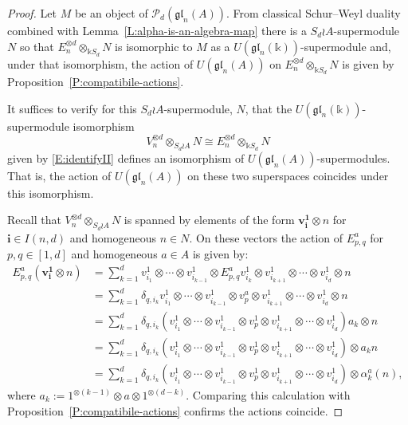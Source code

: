 \documentclass[11pt,reqno]{amsart} %
\newcommand{\gl}{\mathfrak{gl}}
\renewcommand{\k}{\mathds{k}}
\newcommand{\0}{\bar{0}}
\newcommand{\1}{\bar{1}}
\newcommand{\wreath}{\wr}
\newcommand{\bv}{\mathbf{v}}
\newcommand{\SdwreathA}{S_{d} \wreath A}
\newcommand{\bi}{\mathbf{i}}
\newcommand{\bone}{\mathbf{1}}
\newcommand{\Pol}{\mathcal{P}}
\numberwithin{equation}{subsection}
\begin{document}
\begin{proof} Let $M$ be an object of $\Pol_{d}(\gl_{n}(A))$.  From classical Schur--Weyl duality combined with Lemma~\ref{L:alpha-is-an-algebra-map} there is a $\SdwreathA$-supermodule $N$ so that $E_{n}^{\otimes d} \otimes_{\k S_{d}} N$ is isomorphic to $M$ as a $U(\gl_{n}(\k ))$-supermodule and, under that isomorphism, the action of $U(\gl_{n}(A))$ on $E_{n}^{\otimes d} \otimes_{\k S_{d}} N$ is given by Proposition~\ref{P:compatibile-actions}.


It suffices to verify for this $\SdwreathA$-supermodule, $N$, that the $U(\gl_{n}(\k ))$-supermodule isomorphism 
\[
V_{n}^{\otimes d} \otimes_{\SdwreathA} N \cong E_{n}^{\otimes d} \otimes_{\k S_{d}} N
\]
given by \eqref{E:identifyII} defines an isomorphism of $U(\gl_{n}(A))$-supermodules.  That is, the action of $U(\gl_{n}(A))$ on these two superspaces coincides under this isomorphism.

Recall that $V_{n}^{\otimes d} \otimes_{\SdwreathA} N$ is spanned by elements of the form $\bv^{\bone }_{\bi} \otimes n$ for $\bi \in I(n,d)$ and homogeneous $n\in N$.  On these vectors the action of $E_{p,q}^{a}$ for $p,q \in [1,d]$ and homogeneous $a \in A$ is given by: 
\begin{align*}
E^{a}_{p,q} (\bv^{\bone}_{\bi}\otimes n) &= \sum_{k=1}^{d} v^{1}_{i_{1}} \otimes \dotsb \otimes v^{1}_{i_{k-1}} \otimes E^{a}_{p,q}v^{1}_{i_{k}} \otimes v^{1}_{i_{k+1}} \otimes \dotsb \otimes v^{1}_{i_{d}} \otimes n \\
&= \sum_{k=1}^{d} \delta_{q, i_{k}}v^{1}_{i_{1}} \otimes \dotsb \otimes v^{1}_{i_{k-1}} \otimes v^{a}_{p} \otimes v^{1}_{i_{k+1}} \otimes \dotsb \otimes v^{1}_{i_{d}} \otimes n \\
&= \sum_{k=1}^{d} \delta_{q, i_{k}}(v^{1}_{i_{1}} \otimes \dotsb \otimes v^{1}_{i_{k-1}} \otimes v^{1}_{p} \otimes v^{1}_{i_{k+1}} \otimes \dotsb \otimes v^{1}_{i_{d}})a_{k} \otimes n \\
&= \sum_{k=1}^{d} \delta_{q, i_{k}}(v^{1}_{i_{1}} \otimes \dotsb \otimes v^{1}_{i_{k-1}} \otimes v^{1}_{p} \otimes v^{1}_{i_{k+1}} \otimes \dotsb \otimes v^{1}_{i_{d}}) \otimes a_{k}n\\
&= \sum_{k=1}^{d} \delta_{q, i_{k}}(v^{1}_{i_{1}} \otimes \dotsb \otimes v^{1}_{i_{k-1}} \otimes v^{1}_{p} \otimes v^{1}_{i_{k+1}} \otimes \dotsb \otimes v^{1}_{i_{d}}) \otimes \alpha^{a}_{k}(n),
\end{align*} where $a_{k} := 1^{\otimes (k-1)} \otimes a \otimes 1^{\otimes (d-k)}$.   Comparing this calculation with Proposition~\ref{P:compatibile-actions} confirms the actions coincide. 
\end{proof}
\end{document}
